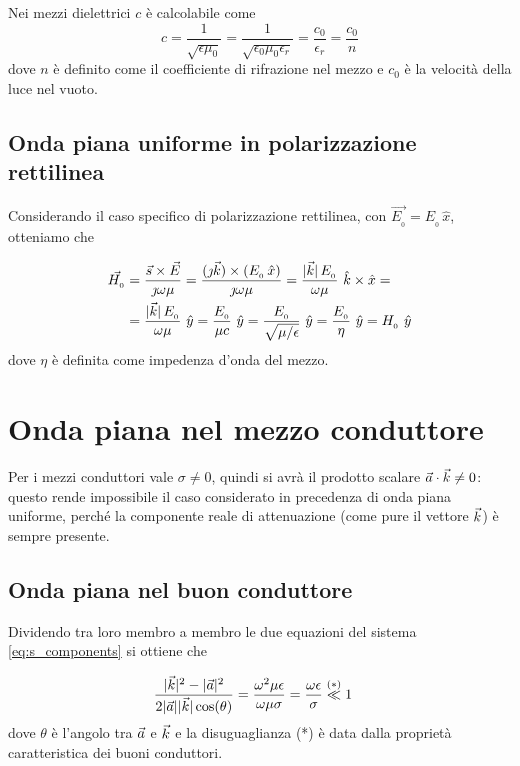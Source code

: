 		Nei mezzi dielettrici $c$ è calcolabile come
		\begin{equation*}
				c = \frac{1}{\sqrt{\epsilon \mu_0}} = \frac{1}{\sqrt{\epsilon_0 \mu_0 \epsilon_r}} = \frac{c_0}{\epsilon_r} = \frac{c_0}{n}
		\end{equation*}
		dove $n$ è definito come il coefficiente di rifrazione nel mezzo e $c_0$ è la velocità della luce nel vuoto.

	\subsection{Onda piana uniforme in polarizzazione rettilinea}
		Considerando il caso specifico di polarizzazione rettilinea, con $\vec{E_{_{0}}} = E_{_{0}} \, \hat{x}$, otteniamo che

		\begin{equation*} \begin{split}
			\vec{H_{_{0}}} &= \frac{\vec{s} \times \vec{E}} {\jmath \omega \mu}
				= \frac{(\jmath \vec{k}) \times (E_{_{0}} \, \hat{x})}{\jmath \omega \mu}
				= \frac{|\vec{k}| \, E_{_{0}}}{\omega \mu} ~ \hat{k} \times \hat{x} = \\
			& = \frac{|\vec{k}| \, E_{_{0}}}{\omega \mu} ~ \hat{y}
				= \frac{E_{_{0}}}{\mu c} ~ \hat{y}
				= \frac{E_{_{0}}}{\sqrt{\mu / \epsilon}} ~ \hat{y}
				= \frac{E_{_{0}}}{\eta} ~ \hat{y}
				= H_{_{0}} ~ \hat{y}
		\end{split} \end{equation*}
		dove $\eta$ è definita come impedenza d'onda del mezzo.

\section{Onda piana nel mezzo conduttore}
	Per i mezzi conduttori vale $\sigma \neq 0$, quindi si avrà il prodotto scalare $\vec{a} \cdot \vec{k} \neq 0$: questo rende impossibile il caso considerato in precedenza di onda piana uniforme, perché la componente reale di attenuazione (come pure il vettore $\vec{k}$) è sempre presente.

	\subsection{Onda piana nel buon conduttore} \label{sec:onda_piana_conduttore}
		Dividendo tra loro membro a membro le due equazioni del sistema \eqref{eq:s_components} si ottiene che

		\begin{equation*} \begin{split}
			& \frac{|\vec{k}|^2 - |\vec{a}|^2}{2 |\vec{a}| |\vec{k}| \cos(\theta)}
				= \frac{\omega^2 \mu \epsilon}{\omega \mu \sigma}
				= \frac{\omega \epsilon}{\sigma} \stackrel{(*)}{\ll} 1
		\end{split} \end{equation*}
		dove $\theta$ è l'angolo tra $\vec{a}$ e $\vec{k}$ e la disuguaglianza (*) è data dalla proprietà caratteristica dei buoni conduttori.

